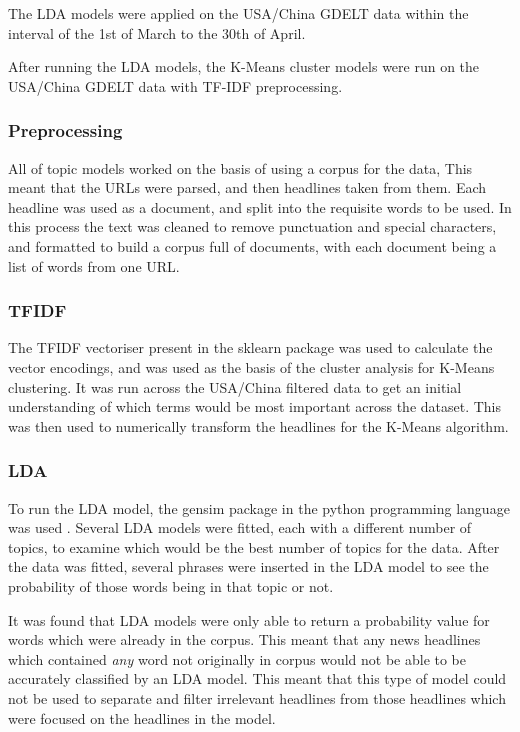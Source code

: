 The LDA models were applied on the USA/China GDELT data within the interval of the 1st of March to the 30th of April. 

After running the LDA models, the K-Means cluster models were run on the USA/China GDELT data with TF-IDF preprocessing.

\subsubsection{Preprocessing}
All of topic models worked on the basis of using a corpus for the data, This meant that the URLs were parsed, and then headlines taken from them. Each headline was used as a document, and split into the requisite words to be used. In this process the text was cleaned to remove punctuation and special characters, and formatted to build a corpus full of documents, with each document being a list of words from one URL. 
\subsubsection{TFIDF}
The TFIDF vectoriser present in the sklearn package was used to calculate the vector encodings, and was used as the basis of the cluster analysis for K-Means clustering. It was run across the USA/China filtered data to get an initial understanding of which terms would be most important across the dataset. This was then used to numerically transform the headlines for the K-Means algorithm. 

\subsubsection{LDA}
To run the LDA model, the gensim package in the python programming language was used \cite{rehurek_lrec}. Several LDA models were fitted, each with a different number of topics, to examine which would be the best number of topics for the data. After the data was fitted, several phrases were inserted in the LDA model to see the probability of those words being in that topic or not. 

It was found that LDA models were only able to return a probability value for words which were already in the corpus.  This meant that any news headlines which contained \textit{any} word not originally in corpus would not be able to be accurately classified by an LDA model. This meant that this type of model could not be used to separate and filter irrelevant headlines from those headlines which were focused on the headlines in the model. 


